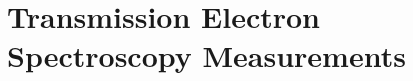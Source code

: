 		\section{Transmission Electron Spectroscopy Measurements}{\label{sec::tem}}

			\begin{figure}[htp]
				\begin{subfigure}[t]{ 0.49\linewidth}
					\centering
					\caption{}
					\label{subfig::tem_crystal}
				\end{subfigure}
				\hfill
				\begin{subfigure}[t]{ 0.49\linewidth}
					\centering
					\caption{}

\end{subfigure}
\end{figure}
